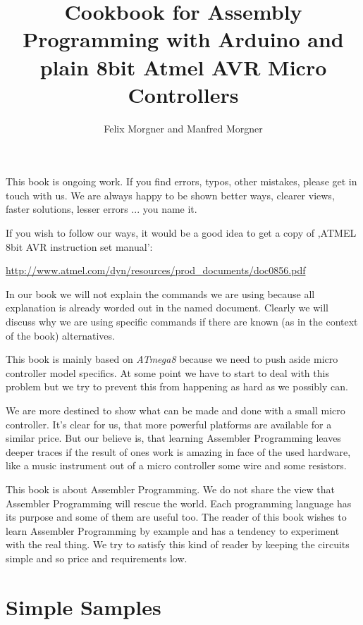 \documentclass[twoside,english,12pt,authoryear,openright]{book}
\newcommand{\at}{\textit{ATmega8} }
\begin{document}

\title{Cookbook for Assembly Programming with Arduino and plain 8bit Atmel AVR Micro Controllers}

\author{Felix Morgner and Manfred Morgner}


\maketitle

This book is ongoing work. If you find errors, typos, other mistakes, please get in touch with us. We are always happy to be shown better ways, clearer views, faster solutions, lesser errors ... you name it.

If you wish to follow our ways, it would be a good idea to get a copy of  ,ATMEL 8bit AVR instruction set manual':

\url{http://www.atmel.com/dyn/resources/prod_documents/doc0856.pdf}

In our book we will not explain the commands we are using because all explanation is already worded out in the named document. Clearly we will discuss why we are using specific commands if there are known (as in the context of the book) alternatives.

This book is mainly based on \at because we need to push aside micro controller model specifics. At some point we have to start to deal with this problem but we try to prevent this from happening as hard as we possibly can.

We are more destined to show what can be made and done with a small micro controller. It's clear for us, that more powerful platforms are available for a similar price. But our believe is, that learning Assembler Programming leaves deeper traces if the result of ones work is amazing in face of the used hardware, like a music instrument out of a micro controller some wire and some resistors.

This book is about Assembler Programming. We do not share the view that Assembler Programming will rescue the world. Each programming language has its purpose and some of them are useful too. The reader of this book wishes to learn Assembler Programming by example and has a tendency to experiment with the real thing. We try to satisfy this kind of reader by keeping the circuits simple and so price and requirements low.


\tableofcontents{}
\listoffigures{}

\part{Simple Samples}
\end{document}
